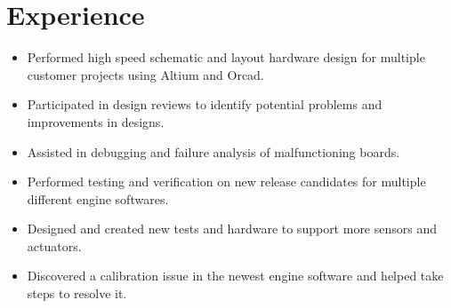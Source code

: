 \documentclass[]{deedy-resume-openfont}
\begin{document}
\begin{minipage}[t]{0.66\textwidth} 


\section{Experience}


\begin{itemize}
    \setlength\itemsep{0pt}
    \item Performed high speed schematic and layout hardware design for multiple customer projects using Altium and Orcad.    
    \item Participated in design reviews to identify potential problems and improvements in designs.
    \item Assisted in debugging and failure analysis of malfunctioning boards. 
\end{itemize}


\begin{itemize}
    \setlength\itemsep{0pt}
    \item Performed testing and verification on new release candidates for multiple different engine softwares.
    \item Designed and created new tests and hardware to support more sensors and actuators.
    \item Discovered a calibration issue in the newest engine software and helped take steps to resolve it. 
\end{itemize}




\end{minipage}
\end{document}
